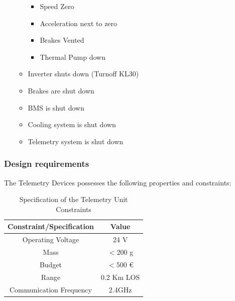 \begin{itemize}
\begin{itemize}
        \begin{itemize}
            \item Speed Zero
            \item Acceleration next to zero
            \item Brakes Vented
            \item Thermal Pump down
        \end{itemize}
        \item Inverter shuts down (Turnoff KL30)
        \item Brakes are shut down
        \item BMS is shut down
        \item Cooling system is shut down
        \item Telemetry system is shut down
    \end{itemize}
\end{itemize}

\subsubsection{Design requirements}
The Telemetry Devices possesses the following properties and constraints:
\begin{table}[H]
    \centering
    \begin{adjustbox}{width=0.5\textwidth,center}
    \begin{tabular}{|c|c|}
    \hline
        \textbf{Constraint/Specification} & \textbf{Value} \\ \hline
        Operating Voltage & 24 V \\ \hline
        Mass & $<200$ g \\ \hline
        Budget & $<500$ € \\ \hline
        Range & 0.2 Km LOS \\ \hline
        Communication Frequency & 2.4GHz \\ \hline
    \end{tabular}
    \end{adjustbox}
     \caption{Specification of the Telemetry Unit Constraints}
\label{tab:Telemetry Constraints}
\end{table}

